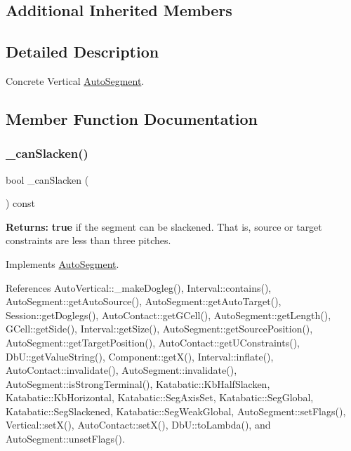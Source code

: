 \subsection*{Additional Inherited Members}


\subsection{Detailed Description}
Concrete Vertical \hyperlink{classKatabatic_1_1AutoSegment}{Auto\+Segment}. 

\subsection{Member Function Documentation}
\mbox{\label{classKatabatic_1_1AutoVertical_a2ced98fb06f208aa88c0962a706e64db}} 
\subsubsection{\texorpdfstring{\+\_\+can\+Slacken()}{\_canSlacken()}}
{\footnotesize\ttfamily bool \+\_\+can\+Slacken (\begin{DoxyParamCaption}{ }\end{DoxyParamCaption}) const\hspace{0.3cm}{\ttfamily [virtual]}}

{\bfseries Returns\+:} {\bfseries true} if the segment can be slackened. That is, source or target constraints are less than three pitches. 

Implements \hyperlink{classKatabatic_1_1AutoSegment_a676fcb7ece71d129b7a4d87a3f2e07aa}{Auto\+Segment}.



References Auto\+Vertical\+::\+\_\+make\+Dogleg(), Interval\+::contains(), Auto\+Segment\+::get\+Auto\+Source(), Auto\+Segment\+::get\+Auto\+Target(), Session\+::get\+Doglegs(), Auto\+Contact\+::get\+G\+Cell(), Auto\+Segment\+::get\+Length(), G\+Cell\+::get\+Side(), Interval\+::get\+Size(), Auto\+Segment\+::get\+Source\+Position(), Auto\+Segment\+::get\+Target\+Position(), Auto\+Contact\+::get\+U\+Constraints(), Db\+U\+::get\+Value\+String(), Component\+::get\+X(), Interval\+::inflate(), Auto\+Contact\+::invalidate(), Auto\+Segment\+::invalidate(), Auto\+Segment\+::is\+Strong\+Terminal(), Katabatic\+::\+Kb\+Half\+Slacken, Katabatic\+::\+Kb\+Horizontal, Katabatic\+::\+Seg\+Axis\+Set, Katabatic\+::\+Seg\+Global, Katabatic\+::\+Seg\+Slackened, Katabatic\+::\+Seg\+Weak\+Global, Auto\+Segment\+::set\+Flags(), Vertical\+::set\+X(), Auto\+Contact\+::set\+X(), Db\+U\+::to\+Lambda(), and Auto\+Segment\+::unset\+Flags().

